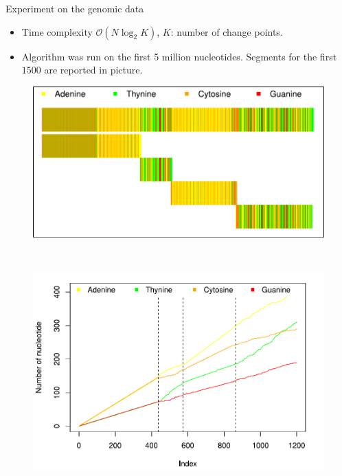 \documentclass{beamer}
\begin{document}
\begin{frame}{Experiment on the genomic data}




\begin{itemize}

\item Time complexity $ \mathcal{O}(N \log_2 K) $, $ K $: number of change points.

\item Algorithm was run on the first 5 million nucleotides.
Segments for the first $ 1500 $ are reported in picture. 

\end{itemize}
	\begin{figure}[h!]
	\centering
	\begin{minipage}{.5\textwidth}
		\centering
		\includegraphics[width=1\linewidth]{DNA_segments.pdf}
	\end{minipage}~
	\begin{minipage}{0.5\textwidth}
		\vspace{13pt}
		\centering
		\includegraphics[width=1.0\linewidth]{DNA_segments_count_2.pdf}
	\end{minipage}
\end{figure}

	
\end{frame}
\end{document}
